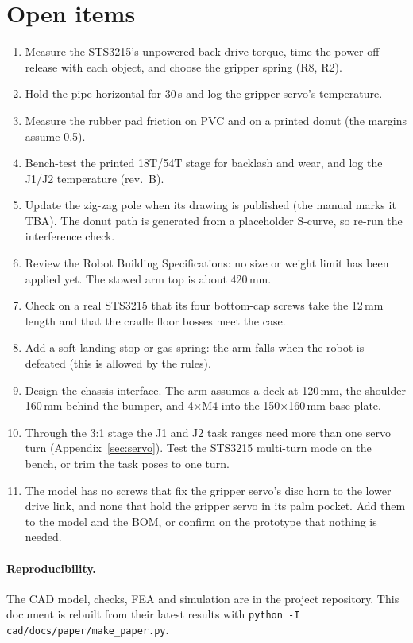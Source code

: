 \documentclass[10pt]{article}
\begin{document}
\section{Open items}
\begin{enumerate}\itemsep0pt
  \item Measure the STS3215's unpowered back-drive torque, time the power-off release with each object, and choose
  the gripper spring (R8, R2).
  \item Hold the pipe horizontal for 30\,s and log the gripper servo's temperature.
  \item Measure the rubber pad friction on PVC and on a printed donut (the margins assume 0.5).
  \item Bench-test the printed 18T/54T stage for backlash and wear, and log the J1/J2 temperature (rev.~B).
  \item Update the zig-zag pole when its drawing is published (the manual marks it TBA). The donut path is generated
  from a placeholder S-curve, so re-run the interference check.
  \item Review the Robot Building Specifications: no size or weight limit has been applied yet. The stowed arm top is
  about 420\,mm.
  \item Check on a real STS3215 that its four bottom-cap screws take the 12\,mm length and that the cradle floor
  bosses meet the case.
  \item Add a soft landing stop or gas spring: the arm falls when the robot is defeated (this is allowed by the rules).
  \item Design the chassis interface. The arm assumes a deck at 120\,mm, the shoulder 160\,mm behind the bumper, and
  4$\times$M4 into the 150$\times$160\,mm base plate.
  \item Through the 3:1 stage the J1 and J2 task ranges need more than one servo turn (Appendix~\ref{sec:servo}). Test the
  STS3215 multi-turn mode on the bench, or trim the task poses to one turn.
  \item The model has no screws that fix the gripper servo's disc horn to the lower drive link, and none that hold the
  gripper servo in its palm pocket. Add them to the model and the BOM, or confirm on the prototype that nothing is needed.
\end{enumerate}

\paragraph{Reproducibility.} The CAD model, checks, FEA and simulation are in the project repository. This document
is rebuilt from their latest results with \texttt{python -I cad/docs/paper/make\_paper.py}.
\end{document}
